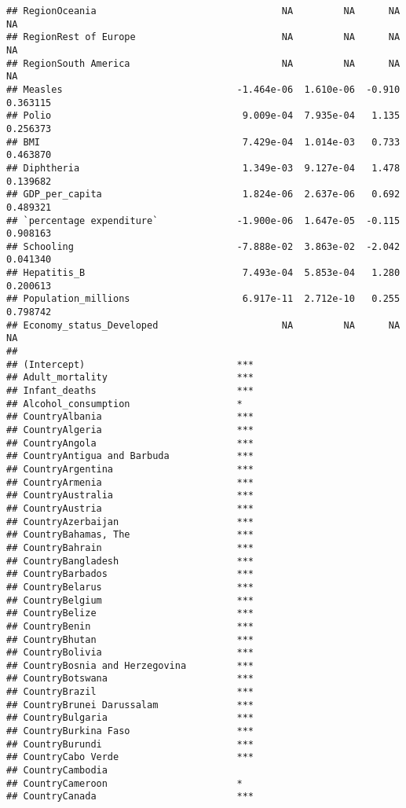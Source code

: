 \documentclass[
]{article}
\begin{document}
\begin{verbatim}
## RegionOceania                                 NA         NA      NA       NA
## RegionRest of Europe                          NA         NA      NA       NA
## RegionSouth America                           NA         NA      NA       NA
## Measles                               -1.464e-06  1.610e-06  -0.910 0.363115
## Polio                                  9.009e-04  7.935e-04   1.135 0.256373
## BMI                                    7.429e-04  1.014e-03   0.733 0.463870
## Diphtheria                             1.349e-03  9.127e-04   1.478 0.139682
## GDP_per_capita                         1.824e-06  2.637e-06   0.692 0.489321
## `percentage expenditure`              -1.900e-06  1.647e-05  -0.115 0.908163
## Schooling                             -7.888e-02  3.863e-02  -2.042 0.041340
## Hepatitis_B                            7.493e-04  5.853e-04   1.280 0.200613
## Population_millions                    6.917e-11  2.712e-10   0.255 0.798742
## Economy_status_Developed                      NA         NA      NA       NA
##                                          
## (Intercept)                           ***
## Adult_mortality                       ***
## Infant_deaths                         ***
## Alcohol_consumption                   *  
## CountryAlbania                        ***
## CountryAlgeria                        ***
## CountryAngola                         ***
## CountryAntigua and Barbuda            ***
## CountryArgentina                      ***
## CountryArmenia                        ***
## CountryAustralia                      ***
## CountryAustria                        ***
## CountryAzerbaijan                     ***
## CountryBahamas, The                   ***
## CountryBahrain                        ***
## CountryBangladesh                     ***
## CountryBarbados                       ***
## CountryBelarus                        ***
## CountryBelgium                        ***
## CountryBelize                         ***
## CountryBenin                          ***
## CountryBhutan                         ***
## CountryBolivia                        ***
## CountryBosnia and Herzegovina         ***
## CountryBotswana                       ***
## CountryBrazil                         ***
## CountryBrunei Darussalam              ***
## CountryBulgaria                       ***
## CountryBurkina Faso                   ***
## CountryBurundi                        ***
## CountryCabo Verde                     ***
## CountryCambodia                          
## CountryCameroon                       *  
## CountryCanada                         ***

\end{verbatim}
\end{document}
